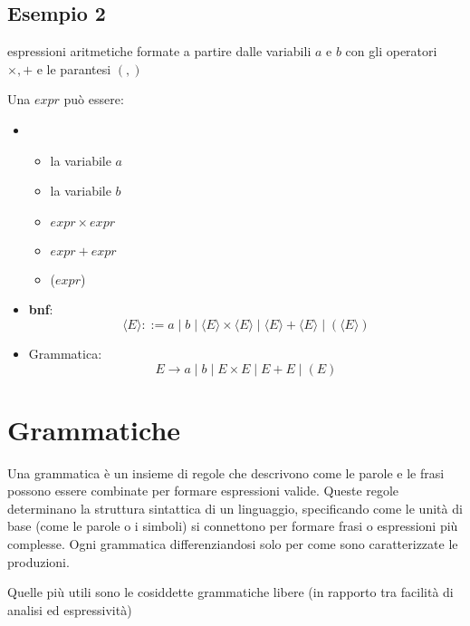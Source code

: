 \subsection{Esempio 2}
espressioni aritmetiche formate a partire dalle variabili $a$ e $b$ con gli operatori $\times, +$ e le parantesi $(,)$

Una $expr$ può essere:
\begin{itemize}
    \item \begin{itemize}
        \item la variabile $a$
        \item la variabile $b$
        \item $expr\times expr$
        \item $expr + expr$
        \item ($expr$)
    \end{itemize}
    \item \textbf{bnf}:
    \[
        \langle E \rangle ::= a\mid b\mid \langle E \rangle\times \langle E \rangle \mid \langle E \rangle + \langle E \rangle\mid (\langle E \rangle)
        
    \]
    \item Grammatica:
    \[
        E\to a\mid b\mid E\times E\mid E+E\mid (E)    
    \]
\end{itemize}

\section{Grammatiche}
Una grammatica è un insieme di regole che descrivono come le parole e le frasi possono essere combinate per formare espressioni valide. Queste regole determinano la struttura sintattica di un linguaggio, specificando come le unità di base (come le parole o i simboli) si connettono per formare frasi o espressioni più complesse. Ogni grammatica  differenziandosi solo per come sono caratterizzate le produzioni.

Quelle più utili sono le cosiddette grammatiche libere (in rapporto tra facilità di analisi ed espressività) 



